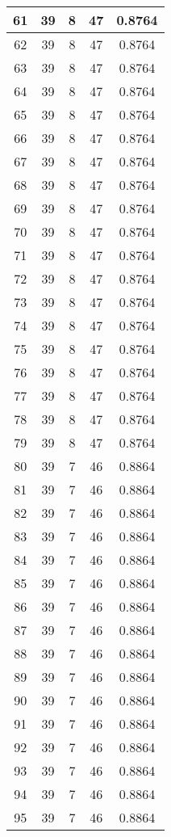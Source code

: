 \documentclass[letterpaper, 12pt]{article}
\begin{document}
\begin{longtable}{|c|c|c|c|c|}
61 & 39 & 8 & 47 & 0.8764 \\
\hline
62 & 39 & 8 & 47 & 0.8764 \\
\hline
63 & 39 & 8 & 47 & 0.8764 \\
\hline
64 & 39 & 8 & 47 & 0.8764 \\
\hline
65 & 39 & 8 & 47 & 0.8764 \\
\hline
66 & 39 & 8 & 47 & 0.8764 \\
\hline
67 & 39 & 8 & 47 & 0.8764 \\
\hline
68 & 39 & 8 & 47 & 0.8764 \\
\hline
69 & 39 & 8 & 47 & 0.8764 \\
\hline
70 & 39 & 8 & 47 & 0.8764 \\
\hline
71 & 39 & 8 & 47 & 0.8764 \\
\hline
72 & 39 & 8 & 47 & 0.8764 \\
\hline
73 & 39 & 8 & 47 & 0.8764 \\
\hline
74 & 39 & 8 & 47 & 0.8764 \\
\hline
75 & 39 & 8 & 47 & 0.8764 \\
\hline
76 & 39 & 8 & 47 & 0.8764 \\
\hline
77 & 39 & 8 & 47 & 0.8764 \\
\hline
78 & 39 & 8 & 47 & 0.8764 \\
\hline
79 & 39 & 8 & 47 & 0.8764 \\
\hline
80 & 39 & 7 & 46 & 0.8864 \\
\hline
81 & 39 & 7 & 46 & 0.8864 \\
\hline
82 & 39 & 7 & 46 & 0.8864 \\
\hline
83 & 39 & 7 & 46 & 0.8864 \\
\hline
84 & 39 & 7 & 46 & 0.8864 \\
\hline
85 & 39 & 7 & 46 & 0.8864 \\
\hline
86 & 39 & 7 & 46 & 0.8864 \\
\hline
87 & 39 & 7 & 46 & 0.8864 \\
\hline
88 & 39 & 7 & 46 & 0.8864 \\
\hline
89 & 39 & 7 & 46 & 0.8864 \\
\hline
90 & 39 & 7 & 46 & 0.8864 \\
\hline
91 & 39 & 7 & 46 & 0.8864 \\
\hline
92 & 39 & 7 & 46 & 0.8864 \\
\hline
93 & 39 & 7 & 46 & 0.8864 \\
\hline
94 & 39 & 7 & 46 & 0.8864 \\
\hline
95 & 39 & 7 & 46 & 0.8864 \\

\end{longtable}
\end{document}
